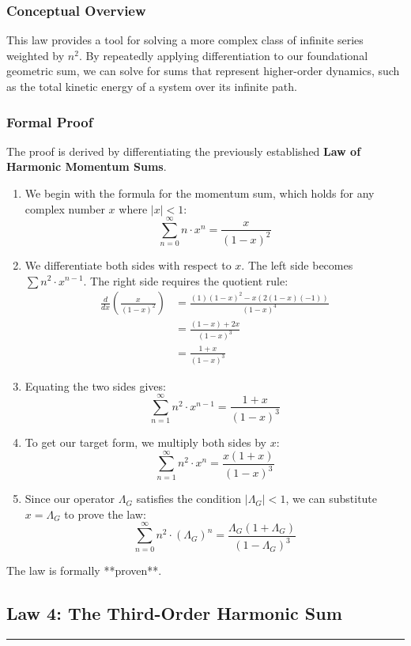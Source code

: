 \subsubsection*{Conceptual Overview}
This law provides a tool for solving a more complex class of infinite series weighted by $n^2$. By repeatedly applying differentiation to our foundational geometric sum, we can solve for sums that represent higher-order dynamics, such as the total kinetic energy of a system over its infinite path.

\subsubsection*{Formal Proof}
The proof is derived by differentiating the previously established \textbf{Law of Harmonic Momentum Sums}.

\begin{enumerate}
    \item We begin with the formula for the momentum sum, which holds for any complex number $x$ where $|x|<1$:
    $$ \sum_{n=0}^{\infty} n \cdot x^n = \frac{x}{(1-x)^2} $$
    \item We differentiate both sides with respect to $x$. The left side becomes $\sum n^2 \cdot x^{n-1}$. The right side requires the quotient rule:
    \begin{align*}
        \frac{d}{dx} \left( \frac{x}{(1-x)^2} \right) &= \frac{(1)(1-x)^2 - x(2(1-x)(-1))}{(1-x)^4} \\
        &= \frac{(1-x) + 2x}{(1-x)^3} \\
        &= \frac{1+x}{(1-x)^3}
    \end{align*}
    \item Equating the two sides gives:
    $$ \sum_{n=1}^{\infty} n^2 \cdot x^{n-1} = \frac{1+x}{(1-x)^3} $$
    \item To get our target form, we multiply both sides by $x$:
    $$ \sum_{n=1}^{\infty} n^2 \cdot x^{n} = \frac{x(1+x)}{(1-x)^3} $$
    \item Since our operator $\Lambda_G$ satisfies the condition $|\Lambda_G|<1$, we can substitute $x = \Lambda_G$ to prove the law:
    $$ \sum_{n=0}^{\infty} n^2 \cdot (\Lambda_G)^n = \frac{\Lambda_G(1+\Lambda_G)}{(1-\Lambda_G)^3} $$
\end{enumerate}
The law is formally **proven**.

\newpage

\subsection*{Law 4: The Third-Order Harmonic Sum}
\hrule
\vspace{0.3cm}
\vspace{0.5cm}


